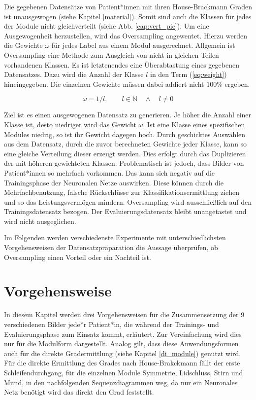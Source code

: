 Die gegebenen Datensätze von Patient*innen mit ihren House-Brackmann Graden ist unausgewogen (siehe Kapitel \ref{material}). Somit sind auch die Klassen für jedes der Module nicht gleichverteilt (siehe Abb. \ref{cap:vert_pie}). Um eine Ausgewogenheit herzustellen, wird das Oversampling angewentet. Hierzu werden die Gewichte $\omega$ für jedes Label aus einem Modul ausgerechnet. Allgemein ist Oversampling eine Methode zum Ausgleich von nicht in gleichen Teilen vorhandenen Klassen. Es ist letztenendes eine Überabtastung eines gegebenen Datensatzes. Dazu wird die Anzahl der Klasse $l$ in den Term (\ref{eq:weight}) hineingegeben. Die einzelnen Gewichte müssen dabei addiert nicht $100\%$ ergeben.

\begin{equation}
\omega = 1 / l, \qquad l \in \mathbb{N} \quad \land \quad l \neq 0 \label{eq:weight}
\end{equation}

Ziel ist es einen ausgewogenen Datensatz zu generieren. Je höher die Anzahl einer Klasse ist, desto niedriger wird das Gewicht $\omega$. Ist eine Klasse eines spezifischen Modules niedrig, so ist ihr Gewicht dagegen hoch. Durch geschicktes Auswählen aus dem Datensatz, durch die zuvor berechneten Gewichte jeder Klasse, kann so eine gleiche Verteilung dieser erzeugt werden. Dies erfolgt durch das Duplizieren der mit höheren gewichteten Klassen. Problematisch ist jedoch, dass Bilder von Patient*innen so mehrfach vorkommen. Das kann sich negativ auf die Trainingsphase der Neuronalen Netze auswirken. Diese können durch die Mehrfachbenutzung, falsche Rückschlüsse zur Klassifikationsermittlung ziehen und so das Leistungsvermögen mindern. Oversampling wird ausschließlich auf den Trainingsdatensatz bezogen. Der Evaluierungsdatensatz bleibt unangetastet und wird nicht ausgeglichen.

Im Folgenden werden verschiedenste Experimente mit unterschiedlichsten Vorgehensweisen der Datensatzpräparation die Aussage überprüfen, ob Oversampling einen Vorteil oder ein Nachteil ist.



\clearpage
\section{Vorgehensweise}\label{process}
In diesem Kapitel werden drei Vorgehensweisen für die Zusammensetzung der 9 verschiedenen Bilder jede*r Patient*in, die während der Trainings- und Evaluierungsphase zum Einsatz kommt, erläutert. Zur Vereinfachung wird dies nur für die Modulform dargestellt. Analog gilt, dass diese Anwendungsformen auch für die direkte Gradermittlung (siehe Kapitel \ref{di_module}) genutzt wird. Für die direkte Ermittlung des Grades nach House-Brakckmann fällt der erste Schleifendurchgang, für die einzelnen Module Symmetrie, Lidschluss, Stirn und Mund, in den nachfolgenden Sequenzdiagrammen weg, da nur ein Neuronales Netz benötigt wird das direkt den Grad feststellt.

